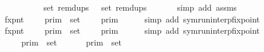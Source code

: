 \begin{isabellebody}
%
\isadelimproof
%
\endisadelimproof
%
\isatagproof
{}\isamarkupfalse%
\ {\isacharminus}\ \ \ \ \ \isanewline
\ \ \isamarkupfalse%
\ {\isacartoucheopen}set\ {\isacharparenleft}remdups\ {\isasymGamma}{\isacharparenright}\ {\isacharequal}\ set\ {\isacharparenleft}remdups\ {\isasymGamma}{\isacharprime}{\isacharparenright}{\isacartoucheclose}\isanewline
\ \ \ \ \isamarkupfalse%
\ {\isacharparenleft}simp\ add{\isacharcolon}\ assms{\isacharparenright}\isanewline
\ \ \isamarkupfalse%
\ \isamarkupfalse%
\ fxpnt{\isasymGamma}{\isacharcolon}\ {\isacartoucheopen}{\isasymInter}\ {\isacharparenleft}{\isacharparenleft}{\isasymlambda}{\isasymgamma}{\isachardot}\ {\isasymlbrakk}\ {\isasymgamma}\ {\isasymrbrakk}\isactrlsub p\isactrlsub r\isactrlsub i\isactrlsub m{\isacharparenright}\ {\isacharbackquote}\ set\ {\isasymGamma}{\isacharparenright}\ {\isacharequal}\ {\isasymlbrakk}{\isasymlbrakk}\ {\isasymGamma}\ {\isasymrbrakk}{\isasymrbrakk}\isactrlsub p\isactrlsub r\isactrlsub i\isactrlsub m{\isacartoucheclose}\isanewline
\ \ \ \ \isamarkupfalse%
\ {\isacharparenleft}simp\ add{\isacharcolon}\ symrun{\isacharunderscore}interp{\isacharunderscore}fixpoint{\isacharparenright}\isanewline
\ \ \isamarkupfalse%
\ \isamarkupfalse%
\ fxpnt{\isasymGamma}{\isacharprime}{\isacharcolon}\ {\isacartoucheopen}{\isasymInter}\ {\isacharparenleft}{\isacharparenleft}{\isasymlambda}{\isasymgamma}{\isachardot}\ {\isasymlbrakk}\ {\isasymgamma}\ {\isasymrbrakk}\isactrlsub p\isactrlsub r\isactrlsub i\isactrlsub m{\isacharparenright}\ {\isacharbackquote}\ set\ {\isasymGamma}{\isacharprime}{\isacharparenright}\ {\isacharequal}\ {\isasymlbrakk}{\isasymlbrakk}\ {\isasymGamma}{\isacharprime}\ {\isasymrbrakk}{\isasymrbrakk}\isactrlsub p\isactrlsub r\isactrlsub i\isactrlsub m{\isacartoucheclose}\isanewline
\ \ \ \ \isamarkupfalse%
\ {\isacharparenleft}simp\ add{\isacharcolon}\ symrun{\isacharunderscore}interp{\isacharunderscore}fixpoint{\isacharparenright}\isanewline
\ \ \isamarkupfalse%
\ \isamarkupfalse%
\ {\isacartoucheopen}{\isasymInter}\ {\isacharparenleft}{\isacharparenleft}{\isasymlambda}{\isasymgamma}{\isachardot}\ {\isasymlbrakk}\ {\isasymgamma}\ {\isasymrbrakk}\isactrlsub p\isactrlsub r\isactrlsub i\isactrlsub m{\isacharparenright}\ {\isacharbackquote}\ set\ {\isasymGamma}{\isacharparenright}\ {\isacharequal}\ {\isasymInter}\ {\isacharparenleft}{\isacharparenleft}{\isasymlambda}{\isasymgamma}{\isachardot}\ {\isasymlbrakk}\ {\isasymgamma}\ {\isasymrbrakk}\isactrlsub p\isactrlsub r\isactrlsub i\isactrlsub m{\isacharparenright}\ {\isacharbackquote}\ set\ {\isasymGamma}{\isacharprime}{\isacharparenright}{\isacartoucheclose}\isanewline

\end{isabellebody}
